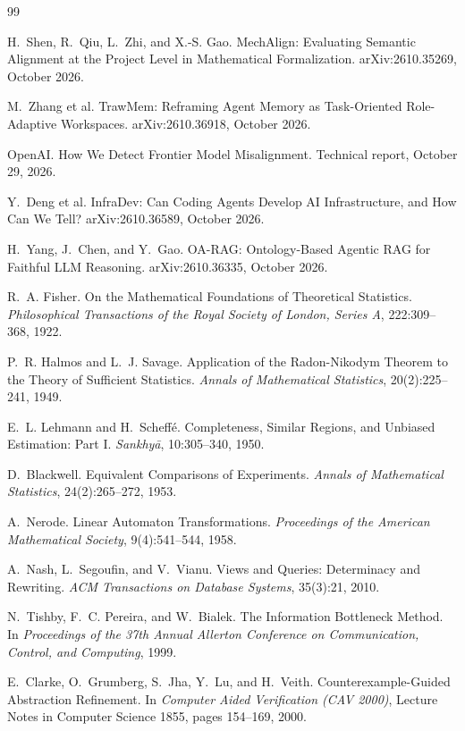 \documentclass[11pt]{article}
\theoremstyle{remark}
\begin{document}
\begin{thebibliography}{99}

H.~Shen, R.~Qiu, L.~Zhi, and X.-S. Gao.
\newblock MechAlign: Evaluating Semantic Alignment at the Project Level in Mathematical Formalization.
\newblock arXiv:2610.35269, October 2026.

M.~Zhang et al.
\newblock TrawMem: Reframing Agent Memory as Task-Oriented Role-Adaptive Workspaces.
\newblock arXiv:2610.36918, October 2026.

OpenAI.
\newblock How We Detect Frontier Model Misalignment.
\newblock Technical report, October 29, 2026.

Y.~Deng et al.
\newblock InfraDev: Can Coding Agents Develop AI Infrastructure, and How Can We Tell?
\newblock arXiv:2610.36589, October 2026.

H.~Yang, J.~Chen, and Y.~Gao.
\newblock OA-RAG: Ontology-Based Agentic RAG for Faithful LLM Reasoning.
\newblock arXiv:2610.36335, October 2026.

R.~A. Fisher.
\newblock On the Mathematical Foundations of Theoretical Statistics.
\newblock \emph{Philosophical Transactions of the Royal Society of London, Series A}, 222:309--368, 1922.

P.~R. Halmos and L.~J. Savage.
\newblock Application of the Radon-Nikodym Theorem to the Theory of Sufficient Statistics.
\newblock \emph{Annals of Mathematical Statistics}, 20(2):225--241, 1949.

E.~L. Lehmann and H.~Scheff\'e.
\newblock Completeness, Similar Regions, and Unbiased Estimation: Part I.
\newblock \emph{Sankhy\=a}, 10:305--340, 1950.

D.~Blackwell.
\newblock Equivalent Comparisons of Experiments.
\newblock \emph{Annals of Mathematical Statistics}, 24(2):265--272, 1953.

A.~Nerode.
\newblock Linear Automaton Transformations.
\newblock \emph{Proceedings of the American Mathematical Society}, 9(4):541--544, 1958.

A.~Nash, L.~Segoufin, and V.~Vianu.
\newblock Views and Queries: Determinacy and Rewriting.
\newblock \emph{ACM Transactions on Database Systems}, 35(3):21, 2010.

N.~Tishby, F.~C. Pereira, and W.~Bialek.
\newblock The Information Bottleneck Method.
\newblock In \emph{Proceedings of the 37th Annual Allerton Conference on Communication, Control, and Computing}, 1999.

E.~Clarke, O.~Grumberg, S.~Jha, Y.~Lu, and H.~Veith.
\newblock Counterexample-Guided Abstraction Refinement.
\newblock In \emph{Computer Aided Verification (CAV 2000)}, Lecture Notes in Computer Science 1855, pages 154--169, 2000.

\end{thebibliography}
\end{document}
